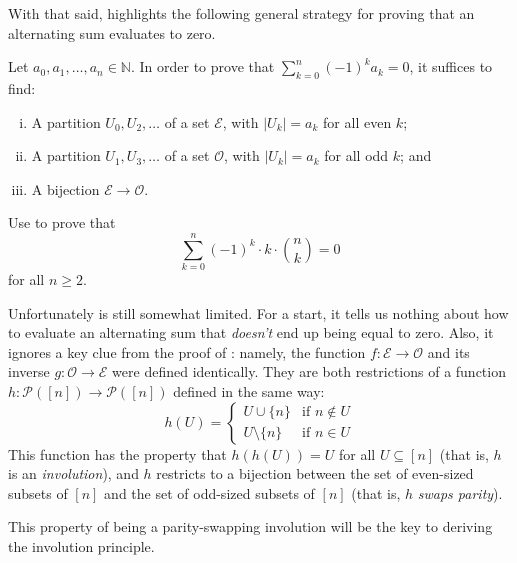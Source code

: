 With that said,  highlights the following general strategy for proving that an alternating sum evaluates to zero.

\begin{strategy}
\label{strPrimitiveInvolutionPrinciple}
Let $a_0,a_1,\dots,a_n \in \mathbb{N}$. In order to prove that $\displaystyle \sum_{k=0}^n (-1)^k a_k = 0$, it suffices to find:
\begin{enumerate}[(i)]
\item A partition $U_0, U_2, \dots$ of a set $\mathcal{E}$, with $|U_k| = a_k$ for all even $k$;
\item A partition $U_1, U_3, \dots$ of a set $\mathcal{O}$, with $|U_k| = a_k$ for all odd $k$; and
\item A bijection $\mathcal{E} \to \mathcal{O}$.
\end{enumerate}
\end{strategy}

\begin{exercise}
\label{exAlternatingSumOfKTimesBinomialCoefficientByPrimitiveInvolutionPrinciple}
Use  to prove that
\[ \displaystyle \sum_{k=0}^n (-1)^k \cdot k \cdot \binom{n}{k} = 0 \]
for all $n \ge 2$.
\end{exercise}

Unfortunately  is still somewhat limited. For a start, it tells us nothing about how to evaluate an alternating sum that \textit{doesn't} end up being equal to zero. Also, it ignores a key clue from the proof of : namely, the function $f : \mathcal{E} \to \mathcal{O}$ and its inverse $g : \mathcal{O} \to \mathcal{E}$ were defined identically. They are both restrictions of a function $h : \mathcal{P}([n]) \to \mathcal{P}([n])$ defined in the same way:
\[ h(U) = \begin{cases} U \cup \{ n \} & \text{if $n \not\in U$} \\ U \setminus \{ n \} & \text{if $n \in U$} \end{cases} \]
This function has the property that $h(h(U)) = U$ for all $U \subseteq [n]$ (that is, $h$ is an \textit{involution}), and $h$ restricts to a bijection between the set of even-sized subsets of $[n]$ and the set of odd-sized subsets of $[n]$ (that is, $h$ \textit{swaps parity}).

This property of being a parity-swapping involution will be the key to deriving the involution principle.

